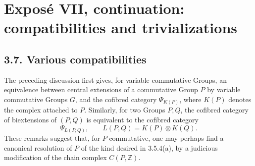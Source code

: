 \documentclass[11pt]{article}
\providecommand{\Ker}{\operatorname{Ker}}
\providecommand{\Ext}{\operatorname{Ext}}
\begin{document}
\providecommand{\Biext}{\operatorname{Biext}}
\providecommand{\Ext}{\operatorname{Ext}}
\providecommand{\Torop}{\operatorname{Tor}}
\providecommand{\GRAB}{\operatorname{GRAB}}
\providecommand{\RHom}{\operatorname{RHom}}
\providecommand{\Ker}{\operatorname{Ker}}
\providecommand{\coker}{\operatorname{coker}}
\providecommand{\cK}{\mathcal K}
\providecommand{\cL}{\mathcal L}
\providecommand{\cM}{\mathcal M}
\providecommand{\cT}{\mathcal T}
\providecommand{\dfn}{\mathrel{\mathrm{dfn}}}


\section*{Exposé VII, continuation: compatibilities and trivializations}

\subsection*{3.7. Various compatibilities}

The preceding discussion first gives, for variable commutative Groups, an equivalence between central extensions of a commutative Group \(P\) by variable commutative Groups \(G\), and the cofibred category \(\Psi_{K(P)}\), where \(K(P)\) denotes the complex attached to \(P\).  Similarly, for two Groups \(P,Q\), the cofibred category of biextensions of \((P,Q)\) is equivalent to the cofibred category
\[
        \Psi_{L(P,Q)},\qquad L(P,Q)=K(P)\otimes K(Q).
\]
These remarks suggest that, for \(P\) commutative, one may perhaps find a canonical resolution of \(P\) of the kind desired in 3.5.4(a), by a judicious modification of the chain complex \(C(P,\mathbb Z)\).
\end{document}
